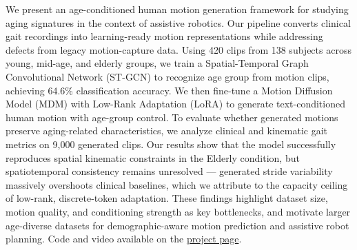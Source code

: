 We present an age-conditioned human motion generation framework for studying aging signatures in the context of assistive robotics.
Our pipeline converts clinical gait recordings into learning-ready motion representations while addressing defects from legacy motion-capture data.
Using 420 clips from 138 subjects across young, mid-age, and elderly groups, we train a Spatial-Temporal Graph Convolutional Network (ST-GCN) to recognize age group from motion clips, achieving 64.6\% classification accuracy.
We then fine-tune a Motion Diffusion Model (MDM) with Low-Rank Adaptation (LoRA) to generate text-conditioned human motion with age-group control.
To evaluate whether generated motions preserve aging-related characteristics, we analyze clinical and kinematic gait metrics on 9,000 generated clips.
Our results show that the model successfully reproduces spatial kinematic constraints in the Elderly condition, but spatiotemporal consistency remains unresolved --- generated stride variability massively overshoots clinical baselines, which we attribute to the capacity ceiling of low-rank, discrete-token adaptation.
These findings highlight dataset size, motion quality, and conditioning strength as key bottlenecks, and motivate larger age-diverse datasets for demographic-aware motion prediction and assistive robot planning.
Code and video available on the \href{https://catr1xliu.github.io/Notebook/Aging-Motion-Project/}{project page}.